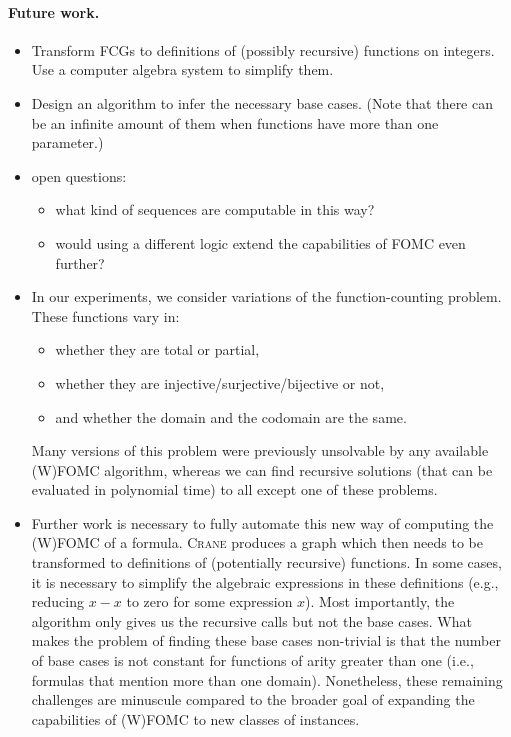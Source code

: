 \paragraph*{Future work.}
\begin{itemize}
  \item Transform FCGs to definitions of (possibly recursive) functions on
        integers. Use a computer algebra system to simplify them.
  \item Design an algorithm to infer the necessary base cases. (Note that there
        can be an infinite amount of them when functions have more than one
        parameter.)
  \item open questions:
  \begin{itemize}
    \item what kind of sequences are computable in this way?
    \item would using a different logic extend the capabilities
    of FOMC even further?
  \end{itemize}
  \item In our experiments, we consider variations of the function-counting
        problem. These functions vary in:
        \begin{itemize}
          \item whether they are total or partial,
          \item whether they are injective/surjective/bijective or not,
          \item and whether the domain and the codomain are the same.
        \end{itemize}
        Many versions of this problem were previously unsolvable by any
        available (W)FOMC algorithm, whereas we can find recursive solutions
        (that can be evaluated in polynomial time) to all except one of these
        problems.
  \item Further work is necessary to fully automate this new way of computing
        the (W)FOMC of a formula. \textsc{Crane} produces a graph which then
        needs to be transformed to definitions of (potentially recursive)
        functions. In some cases, it is necessary to simplify the algebraic
        expressions in these definitions (e.g., reducing $x-x$ to zero for some
        expression $x$). Most importantly, the algorithm only gives us the
        recursive calls but not the base cases. What makes the problem of
        finding these base cases non-trivial is that the number of base cases is
        not constant for functions of arity greater than one (i.e., formulas
        that mention more than one domain). Nonetheless, these remaining
        challenges are minuscule compared to the broader goal of expanding the
        capabilities of (W)FOMC to new classes of instances.
\end{itemize}

